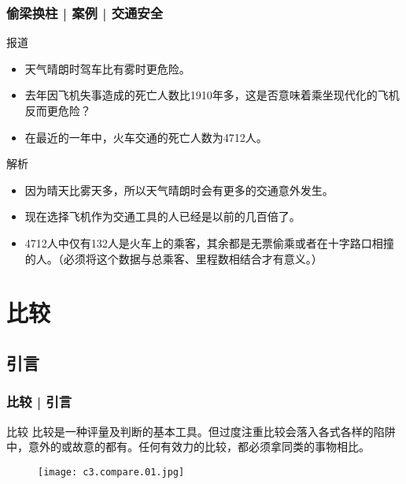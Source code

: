 \begin{frame}
  \frametitle{偷梁换柱 | 案例 | 交通安全}
  \begin{block}{报道}
    \begin{itemize}
      \item 天气晴朗时驾车比有雾时更危险。
      \item 去年因飞机失事造成的死亡人数比1910年多，这是否意味着乘坐现代化的飞机反而更危险？
      \item 在最近的一年中，火车交通的死亡人数为4712人。
    \end{itemize}
  \end{block}
  \pause \pause \pause \pause
  \begin{block}{解析}
    \begin{itemize}
      \item 因为晴天比雾天多，所以天气晴朗时会有更多的交通意外发生。
      \item 现在选择飞机作为交通工具的人已经是以前的几百倍了。
      \item 4712人中仅有132人是火车上的乘客，其余都是无票偷乘或者在十字路口相撞的人。（必须将这个数据与总乘客、里程数相结合才有意义。）
    \end{itemize}
  \end{block}
\end{frame}

\section{比较}
\subsection{引言}
\begin{frame}
  \frametitle{比较 | 引言}
  \begin{block}{比较}
    比较是一种评量及判断的基本工具。但过度注重比较会落入各式各样的陷阱中，意外的或故意的都有。任何有效力的比较，都必须拿同类的事物相比。
    \vspace{-2em}
    \begin{figure}
      \centering
      \texttt{[image: c3.compare.01.jpg]}
    \end{figure}
  \end{block}
\end{frame}

